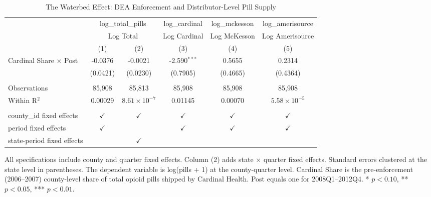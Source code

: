
\begin{table}[htbp]
   \caption{\label{tab:waterbed} The Waterbed Effect: DEA Enforcement and Distributor-Level Pill Supply}
   \bigskip
   \centering
   \begin{adjustbox}{max width=\textwidth}
   \begin{tabular}{lccccc}
      \toprule
       & \multicolumn{2}{c}{log\_total\_pills} & log\_cardinal & log\_mckesson & log\_amerisource\\
       & \multicolumn{2}{c}{Log Total} & Log Cardinal & Log McKesson & Log Amerisource \\ 
                                    & (1)           & (2)                   & (3)            & (4)           & (5)\\  
      \midrule 
      Cardinal Share $\times$ Post  & -0.0376       & -0.0021               & -2.590$^{***}$ & 0.5655        & 0.2314\\   
                                    & (0.0421)      & (0.0230)              & (0.7905)       & (0.4665)      & (0.4364)\\   
       \\
      Observations                  & 85,908        & 85,813                & 85,908         & 85,908        & 85,908\\  
      Within R$^2$                  & 0.00029       & $8.61\times 10^{-7}$  & 0.01145        & 0.00070       & $5.58\times 10^{-5}$\\   
       \\
      county\_id fixed effects      & $\checkmark$  & $\checkmark$          & $\checkmark$   & $\checkmark$  & $\checkmark$\\   
      period fixed effects          & $\checkmark$  &                       & $\checkmark$   & $\checkmark$  & $\checkmark$\\   
      state-period fixed effects    &               & $\checkmark$          &                &               & \\  
      \bottomrule
   \end{tabular}
   \end{adjustbox}
   
   \par \raggedright 
   All specifications include county and quarter fixed effects. Column (2) adds state $\times$ quarter fixed effects. Standard errors clustered at the state level in parentheses. The dependent variable is log(pills + 1) at the county-quarter level. Cardinal Share is the pre-enforcement (2006--2007) county-level share of total opioid pills shipped by Cardinal Health. Post equals one for 2008Q1--2012Q4. * $p<0.10$, ** $p<0.05$, *** $p<0.01$.
\end{table}



